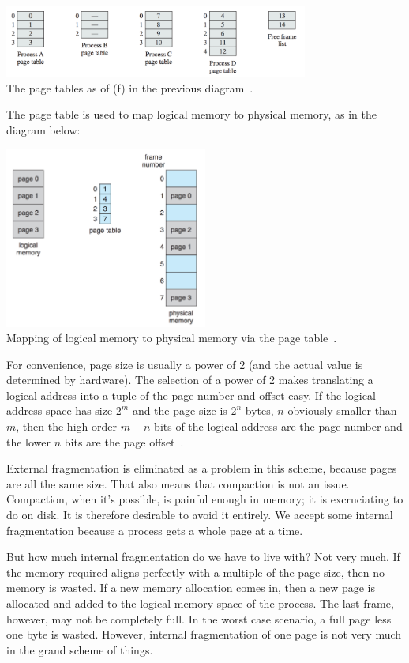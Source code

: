\begin{center}
\includegraphics[width=0.75\textwidth]{images/page-tables.png}\\
The page tables as of (f) in the previous diagram~\cite{osi}.
\end{center}

The page table is used to map logical memory to physical memory, as in the diagram below:

\begin{center}
\includegraphics[width=0.5\textwidth]{images/page-table-mapping.png}\\
Mapping of logical memory to physical memory via the page table~\cite{osc}.
\end{center}

For convenience, page size is usually a power of 2 (and the actual value is determined by hardware). The selection of a power of 2 makes translating a logical address into a tuple of the page number and offset easy. If the logical address space has size $2^{m}$ and the page size is $2^{n}$ bytes, $n$ obviously smaller than $m$, then the high order $m - n$ bits of the logical address are the page number and the lower $n$ bits are the page offset~\cite{osc}. 

External fragmentation is eliminated as a problem in this scheme, because pages are all the same size. That also means that compaction is not an issue. Compaction, when it's possible, is painful enough in memory; it is excruciating to do on disk. It is therefore desirable to avoid it entirely. We accept some internal fragmentation because a process gets a whole page at a time. 

But how much internal fragmentation do we have to live with? Not very much. If the memory required aligns perfectly with a multiple of the page size, then no memory is wasted. If a new memory allocation comes in, then a new page is allocated and added to the logical memory space of the process. The last frame, however, may not be completely full. In the worst case scenario, a full page less one byte is wasted. However, internal fragmentation of one page is not very much in the grand scheme of things.

